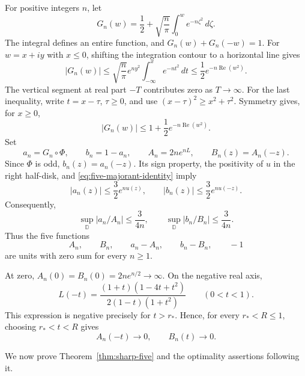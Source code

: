 \documentclass[12pt,letterpaper,reqno]{amsart}
\theoremstyle{definition}
\numberwithin{equation}{section}
\newcommand{\D}{\mathbb D}
\newcommand{\dd}{\,d}
\DeclareMathOperator{\Rea}{Re}
\begin{document}
	For positive integers $n$, let
	\[
	G_n(w)=\frac12+\sqrt{\frac n\pi}
	\int_0^w e^{-n\zeta^2}\dd\zeta.
	\]
	The integral defines an entire function, and
	$G_n(w)+G_n(-w)=1$. For $w=x+iy$ with $x\le0$, shifting the
	integration contour to a horizontal line gives
	\[
	|G_n(w)|
	\le \sqrt{\frac n\pi}e^{ny^2}
	\int_{-\infty}^{x}e^{-nt^2}\dd t
	\le\frac12 e^{-n\Rea(w^2)}.
	\]
	The vertical segment at real part $-T$ contributes zero as
	$T\to\infty$. For the last inequality, write $t=x-\tau$,
	$\tau\ge0$, and use $(x-\tau)^2\ge x^2+\tau^2$.
	Symmetry gives, for $x\ge0$,
	\[
	|G_n(w)|\le1+\frac12e^{-n\Rea(w^2)}.
	\]
	Set
	\[
	a_n=G_n\circ\Phi,\qquad b_n=1-a_n,\qquad
	A_n=2n e^{nL},\qquad B_n(z)=A_n(-z).
	\]
	Since $\Phi$ is odd, $b_n(z)=a_n(-z)$. Its sign property, the
	positivity of $u$ in the right half-disk, and
	\eqref{eq:five-majorant-identity} imply
	\[
	|a_n(z)|\le\frac32e^{nu(z)},\qquad
	|b_n(z)|\le\frac32e^{nu(-z)}.
	\]
	Consequently,
	\begin{equation}\label{eq:five-uniform-ratios}
		\sup_{\D}|a_n/A_n|\le\frac3{4n},\qquad
		\sup_{\D}|b_n/B_n|\le\frac3{4n}.
	\end{equation}
	Thus the five functions
	\begin{equation}\label{eq:five-counterexample}
		A_n,\qquad B_n,\qquad a_n-A_n,\qquad b_n-B_n,\qquad -1
	\end{equation}
	are units with zero sum for every $n\ge1$.
	
	At zero, $A_n(0)=B_n(0)=2ne^{n/2}\to\infty$. On the negative real
	axis,
	\[
	L(-t)=\frac{(1+t)(1-4t+t^2)}{2(1-t)(1+t^2)}
	\qquad(0<t<1).
	\]
	This expression is negative precisely for $t>r_*$. Hence, for every
	$r_*<R\le1$, choosing $r_*<t<R$ gives
	\begin{equation}\label{eq:five-vanishing-points}
		A_n(-t)\longrightarrow0,\qquad B_n(t)\longrightarrow0.
	\end{equation}
	
	We now prove Theorem~\ref{thm:sharp-five} and the optimality assertions
	following it.
	
\end{document}
